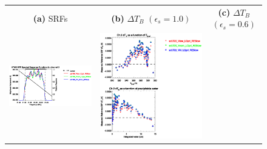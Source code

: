 \begin{figure}[H]
  \centering
  \begin{tabular}{c c c}
    \textsf{\textbf{(a)} SRFs} &
    \textsf{\textbf{(b)} $\Delta T_B$ $(\epsilon_s = 1.0)$} &
    \textsf{\textbf{(c)} $\Delta T_B$ $(\epsilon_s = 0.6)$} \\
    \includegraphics[bb=80 400 280 558,clip,scale=0.85]{graphics/srf/Vset/atms_npp.ch2.osrf.eps} &
    \includegraphics[bb=85 400 260 558,clip,scale=0.85]{graphics/dtb/Vset/e1.0_r0.0/atms_npp.ch2.dTb.eps} & 

\end{tabular}
\end{figure}
